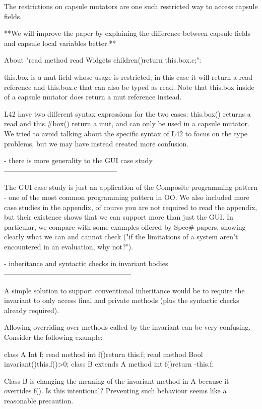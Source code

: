 The restrictions on capsule mutators are one such restricted way to access capsule fields.

**We will improve the paper by explaining the difference between capsule fields and capsule local variables better.**

About "read method read Widgets children(){return this.box.c;}":

this.box is a mut field whose usage is restricted;
in this case it will return a read reference and this.box.c that can also be typed as read.
Note that this.box inside of a capsule mutator does return a mut reference instead.

L42 have two different syntax expressions for the two cases: this.box() returns a read
and this.#box() return a mut, and can only be used in a capsule mutator.
We tried to avoid talking about the specific syntax of L42 to focus on the type problems,
but we may have instead created more confusion.

- there is more generality to the GUI case study
------------------------------------------------

The GUI case study is just an application of the Composite programming pattern - one of the most common programming pattern in OO.
We also included more case studies in the appendix, of course you are not required to read the appendix,
but their existence shows that we can support more than just the GUI.
In particular, we compare with some examples offered by Spec# papers, showing clearly what
we can and cannot check ("if the limitations of a system aren't encountered in an evaluation, why not?").

- inheritance and syntactic checks in invariant bodies
------------------------------------------------------

A simple solution to support conventional inheritance would be to require the invariant to only
access final and private methods (plus the syntactic checks already required).

Allowing overriding over methods called by the invariant can be very confusing.
Consider the following example:

class A{
  Int f;
  read method int f(){return this.f;}
  read method Bool invariant(){this.f()>0;}
}
class B extends A {
  method int f(){return -this.f;}
}

Class B is changing the meaning of the invariant method in A because it overrides f().
Is this intentional? Preventing such behaviour seems like a reasonable precaution.

